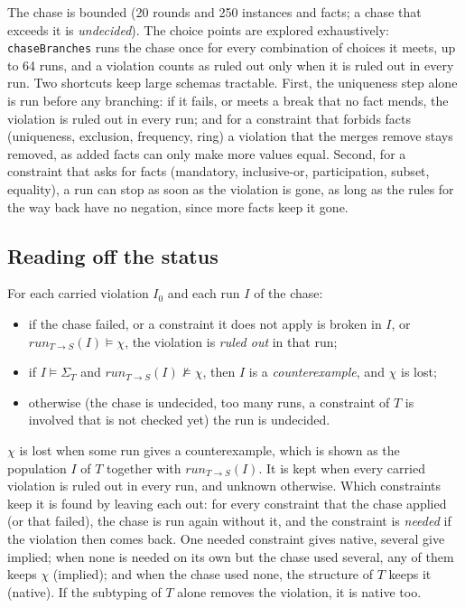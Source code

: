 \documentclass[11pt]{amsart}
\theoremstyle{definition}
\theoremstyle{remark}
\begin{document}
The chase is bounded (20 rounds and 250 instances and facts; a chase that
exceeds it is \emph{undecided}). The choice points are explored
exhaustively: \texttt{chaseBranches} runs the chase once for every
combination of choices it meets, up to 64 runs, and a violation counts as
ruled out only when it is ruled out in every run. Two shortcuts keep large
schemas tractable. First, the uniqueness step alone is run before any
branching: if it fails, or meets a break that no fact mends, the violation
is ruled out in every run; and for a constraint that forbids facts
(uniqueness, exclusion, frequency, ring) a violation that the merges remove
stays removed, as added facts can only make more values equal. Second, for
a constraint that asks for facts (mandatory, inclusive-or, participation,
subset, equality), a run can stop as soon as the violation is gone, as
long as the rules for the way back have no negation, since more facts keep
it gone.

\subsection{Reading off the status}

For each carried violation $I_0$ and each run $I$ of the chase:
\begin{itemize}
  \item if the chase failed, or a constraint it does not apply is broken
    in $I$, or $\mathit{run}_{T \to S}(I) \models \chi$, the violation is
    \emph{ruled out} in that run;
  \item if $I \models \Sigma_T$ and $\mathit{run}_{T \to S}(I) \not\models
    \chi$, then $I$ is a \emph{counterexample}, and $\chi$ is lost;
  \item otherwise (the chase is undecided, too many runs, a constraint of
    $T$ is involved that is not checked yet) the run is undecided.
\end{itemize}
$\chi$ is lost when some run gives a counterexample, which is shown as the
population $I$ of $T$ together with $\mathit{run}_{T \to S}(I)$. It is kept
when every carried violation is ruled out in every run, and unknown
otherwise. Which constraints keep it is found by leaving each out: for
every constraint that the chase applied (or that failed), the chase is run
again without it, and the constraint is \emph{needed} if the violation then
comes back. One needed constraint gives native, several give implied; when
none is needed on its own but the chase used several, any of them keeps
$\chi$ (implied); and when the chase used none, the structure of $T$ keeps
it (native). If the subtyping of $T$ alone removes the violation, it is
native too.
\end{document}
